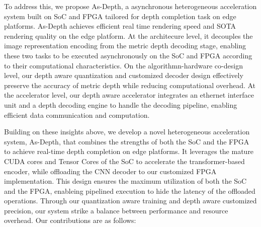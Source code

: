 
To address this, we propose As-Depth, a asynchronous heterogeneous acceleration system built on SoC and FPGA tailored for depth completion task on edge platforms.
As-Depth achieves efficient real time rendering speed and SOTA rendering quality on the edge platform. At the architecure level, it decouples the image representation encoding from the metric depth decoding stage, enabling these two tasks to be executed asynchronously on the SoC and FPGA according to their computational characteristics. On the algorithmn-hardware co-design level, our depth aware quantization and customized decoder design effectively preserve the accuracy of metric depth while reducing computational overhead. At the accelerator level, our depth aware accelerator integrates an ethernet interface unit and a depth decoding engine to handle the decoding pipeline, enabling efficient data communication and computation.

Building on these insights above, we develop a novel heterogeneous acceleration system, As-Depth, that combines the strengths of both the SoC and the FPGA to achieve real-time depth completion on edge platforms. It leverages the mature CUDA cores and Tensor Cores of the SoC to accelerate the transformer-based encoder, while offloading the CNN decoder to our customized FPGA implementation. This design ensures the maximum utilization of both the SoC and the FPGA, enableing pipelined execution to hide the latency of the offloaded operations. Through our quantization aware training and depth aware customized precision, our system strike a balance between performance and resource overhead. Our contributions are as follows:  

